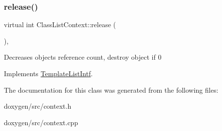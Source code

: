 \mbox{\label{class_class_list_context_a4e60c2feddfa7d51bdebf0e412266b91}} 
\subsubsection{\texorpdfstring{release()}{release()}}
{\footnotesize\ttfamily virtual int Class\+List\+Context\+::release (\begin{DoxyParamCaption}{ }\end{DoxyParamCaption})\hspace{0.3cm}{\ttfamily [inline]}, {\ttfamily [virtual]}}

Decreases object\textquotesingle{}s reference count, destroy object if 0 

Implements \mbox{\hyperlink{class_template_list_intf_a0c53169c740c09dac47efc62bbe39674}{Template\+List\+Intf}}.



The documentation for this class was generated from the following files\+:\begin{DoxyCompactItemize}
\item 
doxygen/src/context.\+h\item 
doxygen/src/context.\+cpp\end{DoxyCompactItemize}
